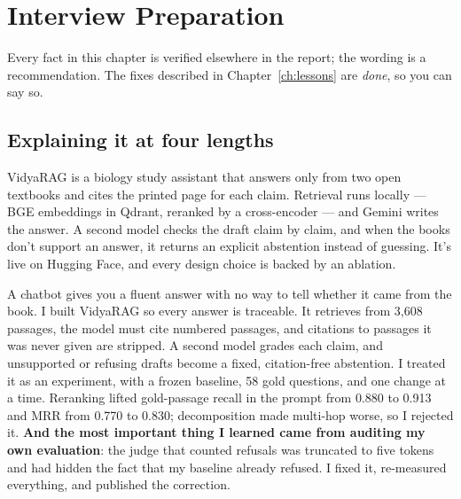 \chapter{Interview Preparation}
\label{ch:interview}

Every fact in this chapter is verified elsewhere in the report; the wording is a recommendation. The fixes described in Chapter~\ref{ch:lessons} are \emph{done}, so you can say so.

\section{Explaining it at four lengths}

\begin{keyidea}[30 seconds]
VidyaRAG is a biology study assistant that answers only from two open textbooks and cites the printed page for each claim. Retrieval runs locally --- BGE embeddings in Qdrant, reranked by a cross-encoder --- and Gemini writes the answer. A second model checks the draft claim by claim, and when the books don't support an answer, it returns an explicit abstention instead of guessing. It's live on Hugging Face, and every design choice is backed by an ablation.
\end{keyidea}

\begin{keyidea}[1 minute]
A chatbot gives you a fluent answer with no way to tell whether it came from the book. I built VidyaRAG so every answer is traceable. It retrieves from 3,608 passages, the model must cite numbered passages, and citations to passages it was never given are stripped. A second model grades each claim, and unsupported or refusing drafts become a fixed, citation-free abstention. I treated it as an experiment, with a frozen baseline, 58 gold questions, and one change at a time. Reranking lifted gold-passage recall in the prompt from 0.880 to 0.913 and MRR from 0.770 to 0.830; decomposition made multi-hop worse, so I rejected it. \textbf{And the most important thing I learned came from auditing my own evaluation}: the judge that counted refusals was truncated to five tokens and had hidden the fact that my baseline already refused. I fixed it, re-measured everything, and published the correction.
\end{keyidea}

